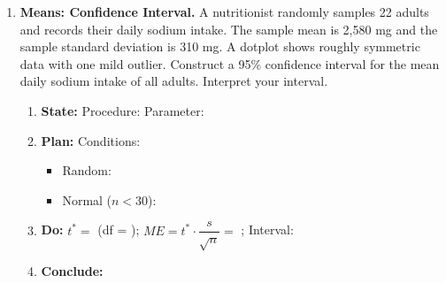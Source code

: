 \documentclass[10pt]{article}
\begin{document}
\begin{enumerate}
      \begin{enumerate}[label=\alph*.]
        \item \textbf{State:} Procedure: \blank{7cm}\\
              $H_0$: \blank{5cm} \quad $H_a$: \blank{5cm}
        \item \textbf{Plan:} Verify conditions (use numbers):
              \begin{itemize}
                \item Random: \writeline
                \item 10\%: \writeline
                \item Large Counts: \writeline
              \end{itemize}
        \item \textbf{Do:} $\hat p_1 =$ \blank{1.5cm} \; $\hat p_2 =$ \blank{1.5cm} \;
              $\hat p_c = \dfrac{54+35}{120+100} =$ \blank{1.8cm}

              $z = \dfrac{(\hat p_1 - \hat p_2)}{\sqrt{\hat p_c(1-\hat p_c)(1/120+1/100)}} \approx$ \blank{1.8cm} \quad $p$-value $\approx$ \blank{2cm}

        \item \textbf{Conclude:} \writeline \writeline
      \end{enumerate}

\vspace{0.10in}

\item \textbf{Means: Confidence Interval.} \;
      A nutritionist randomly samples 22 adults and records their daily sodium intake.
      The sample mean is 2,580 mg and the sample standard deviation is 310 mg. A dotplot
      shows roughly symmetric data with one mild outlier. Construct a 95\% confidence interval
      for the mean daily sodium intake of all adults. Interpret your interval.

      \begin{enumerate}[label=\alph*.]
        \item \textbf{State:} Procedure: \blank{7cm} \quad Parameter: \blank{5cm}
        \item \textbf{Plan:} Conditions:
              \begin{itemize}
                \item Random: \writeline
                \item Normal ($n < 30$): \writeline
              \end{itemize}
        \item \textbf{Do:} $t^* =$ \blank{1.5cm} (df = \blank{1.5cm}); \;
              $ME = t^* \cdot \dfrac{s}{\sqrt{n}} =$ \blank{3cm}; \; Interval: \blank{4cm}
        \item \textbf{Conclude:} \writeline \writeline
      \end{enumerate}


\end{enumerate}
\end{document}
